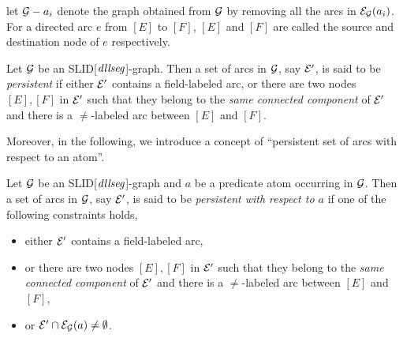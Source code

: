 \documentclass{llncs}
\begin{document}
let $\mathcal{G}-a_i$ denote the graph obtained from $\mathcal{G}$ by removing all the arcs in $\mathcal{E}_{\mathcal{G}}(a_i)$. For a directed arc $e$ from $[E]$ to $[F]$, $[E]$ and $[F]$ are called the source and destination node of $e$ respectively.



\begin{definition}
Let $\mathcal{G}$ be an SLID[$\mathit{dllseg}$]-graph. Then a set of arcs in $\mathcal{G}$, say $\mathcal{E}'$, is said to be \emph{persistent} if either $\mathcal{E}'$ contains a field-labeled arc, or there are two nodes $[E],[F]$ in  $\mathcal{E}'$ such that they belong to the \emph{same connected component} of $\mathcal{E}'$ and there is  a $\neq$-labeled arc between $[E]$ and $[F]$.
\end{definition}

Moreover, in the following, we introduce a concept of ``persistent set of arcs with respect to an atom''.

\begin{definition}
Let $\mathcal{G}$ be an SLID[$\mathit{dllseg}$]-graph and $a$ be a predicate atom occurring in $\mathcal{G}$. Then a set of arcs in $\mathcal{G}$, say $\mathcal{E}'$, is said to be \emph{persistent with respect to $a$} if one of the following constraints holds,
\begin{itemize}
\item either $\mathcal{E}'$ contains a field-labeled arc, 
\item or there are two nodes $[E],[F]$ in  $\mathcal{E}'$ such that they belong to the \emph{same connected component} of $\mathcal{E}'$ and there is  a $\neq$-labeled arc between $[E]$ and $[F]$,
\item or $\mathcal{E}' \cap \mathcal{E}_{\mathcal{G}}(a) \neq \emptyset$.
\end{itemize}
\end{definition}
 



\end{document}
